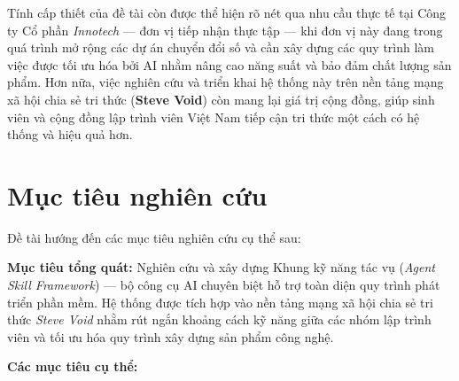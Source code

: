 \documentclass[13pt,a4paper,oneside]{extreport}
\numberwithin{equation}{chapter}
\numberwithin{figure}{chapter}
\numberwithin{table}{chapter}
\begin{document}
Tính cấp thiết của đề tài còn được thể hiện rõ nét qua nhu cầu thực tế tại Công ty Cổ phần \textit{Innotech} — đơn vị tiếp nhận thực tập — khi đơn vị này đang trong quá trình mở rộng các dự án chuyển đổi số và cần xây dựng các quy trình làm việc được tối ưu hóa bởi AI nhằm nâng cao năng suất và bảo đảm chất lượng sản phẩm. Hơn nữa, việc nghiên cứu và triển khai hệ thống này trên nền tảng mạng xã hội chia sẻ tri thức (\textbf{Steve Void}) còn mang lại giá trị cộng đồng, giúp sinh viên và cộng đồng lập trình viên Việt Nam tiếp cận tri thức một cách có hệ thống và hiệu quả hơn.

\section*{Mục tiêu nghiên cứu}

Đề tài hướng đến các mục tiêu nghiên cứu cụ thể sau:

\textbf{Mục tiêu tổng quát:} Nghiên cứu và xây dựng Khung kỹ năng tác vụ (\textit{Agent Skill Framework}) — bộ công cụ AI chuyên biệt hỗ trợ toàn diện quy trình phát triển phần mềm. Hệ thống được tích hợp vào nền tảng mạng xã hội chia sẻ tri thức \textit{Steve Void} nhằm rút ngắn khoảng cách kỹ năng giữa các nhóm lập trình viên và tối ưu hóa quy trình xây dựng sản phẩm công nghệ.

\textbf{Các mục tiêu cụ thể:}
\end{document}
